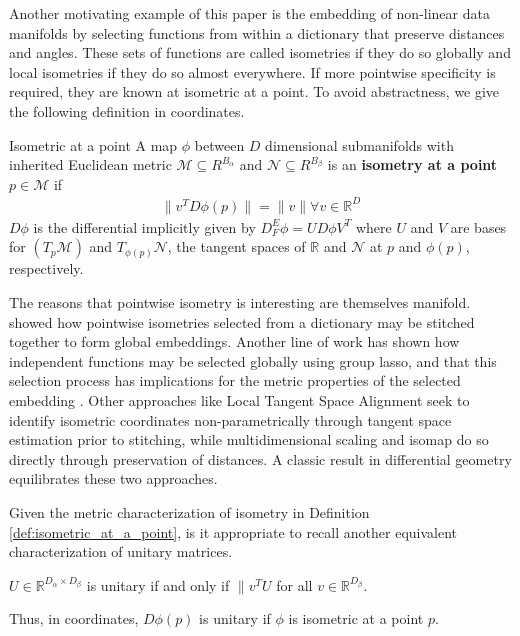 Another motivating example of this paper is the embedding of non-linear data manifolds by selecting functions from within a dictionary that preserve distances and angles.
These sets of functions are called isometries if they do so globally and local isometries if they do so almost everywhere.
If more pointwise specificity is required, they are known at isometric at a point.
To avoid abstractness, we give the following definition in coordinates.
\begin{definition}{Isometric at a point}
\label{def:isometric_at_a_point}
A map $\phi$ between $D$ dimensional submanifolds with inherited Euclidean metric $\mathcal M \subseteq R^{B_\alpha}$ and $\mathcal N  \subseteq R^{B_\beta}$ is an \textbf{isometry at a point} $p \in \mathcal M$ if
\begin{align}
\| v^T D \phi (p) \| = \|v\| \forall v \in \mathbb R^D
\end{align}
$D \phi$ is the differential implicitly given by $D_{F}^E \phi = U D \phi V^T$ where $U$ and $V$ are bases for $(T_p \mathcal M)$ and $T_{\phi(p)} \mathcal N$, the tangent spaces of $\mathbb R$ and $\mathcal N$ at $p$ and $\phi(p)$, respectively.
\end{definition}

The reasons that pointwise isometry is interesting are themselves manifold.
\cite{Kohli2021-lr} showed how pointwise isometries selected from a dictionary may be stitched together to form global embeddings.
Another line of work \cite{Koelle2022-ju, Koelle2024-no} has shown how independent functions may be selected globally using group lasso, and that this selection process has implications for the metric properties of the selected embedding \cite{Koelle2022-ju}.
Other approaches like Local Tangent Space Alignment seek to identify isometric coordinates non-parametrically through tangent space estimation prior to stitching, while multidimensional scaling and isomap do so directly through preservation of distances.
A classic result in differential geometry equilibrates these two approaches.

Given the metric characterization of isometry in Definition \ref{def:isometric_at_a_point}, is it appropriate to recall another equivalent characterization of unitary matrices.
\begin{proposition}
\label{prop:unitary_spectrum}
$U \in \mathbb{R}^{D_\alpha \times D_\beta}$ is unitary if and only if $\| v^T  U$ for all $v \in \mathbb R^{D_\beta}$.
\end{proposition}
Thus, in coordinates, $D \phi (p)$ is unitary if $\phi$ is isometric at a point $p$.

